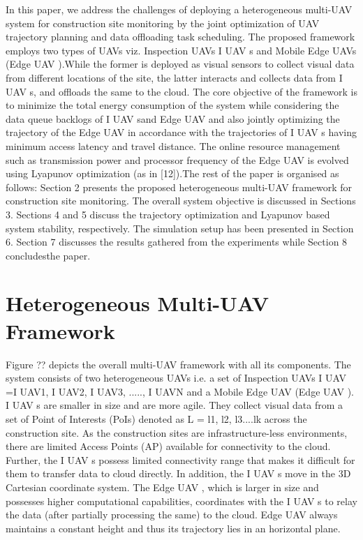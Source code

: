 \documentclass[11pt,twocolumn]{article}
\begin{document}
In this paper, we address the challenges of deploying a heterogeneous multi-UAV system for construction site monitoring by the joint optimization of UAV trajectory planning and data offloading task scheduling. The proposed framework employs two types of UAVs viz. Inspection UAVs I UAV s and Mobile Edge UAVs (Edge UAV ).While the former is deployed as visual sensors to collect visual data from different locations of the site, the latter interacts and collects data from I UAV s, and offloads the same to the cloud. The core objective of the framework is to minimize the total energy consumption of the system while considering the data queue backlogs of I UAV sand Edge UAV and also jointly optimizing the trajectory
of the Edge UAV in accordance with the trajectories of I UAV s having minimum access latency and travel distance. The online resource management such as transmission power and processor frequency of the Edge UAV is evolved using Lyapunov optimization (as in [12]).The rest of the paper is organised as follows: Section 2 presents the proposed heterogeneous multi-UAV framework for construction site monitoring. The overall system objective is discussed in Sections 3. Sections 4 and 5 discuss the trajectory optimization and Lyapunov based system stability, respectively. The simulation setup has been
presented in Section 6. Section 7 discusses the results gathered from the experiments while Section 8 concludesthe paper.
    
\section{Heterogeneous Multi-UAV Framework}
Figure ?? depicts the overall multi-UAV framework with all its components. The system consists of two heterogeneous UAVs i.e. a set of Inspection UAVs I UAV ={I UAV1, I UAV2, I UAV3, ....., I UAVN } and a Mobile Edge UAV (Edge UAV ). I UAV s are smaller in size and are more agile. They collect visual data from a set of Point of Interests (PoIs) denoted as L = {l1, l2, l3....lk} across the construction site. As the construction sites are infrastructure-less environments, there are limited Access Points (AP) available for connectivity to the cloud. Further, the I UAV s possess limited connectivity range that makes it difficult for them to transfer data to cloud directly. In addition, the I UAV s move in the 3D Cartesian coordinate system. The Edge UAV , which is larger in size and possesses higher computational capabilities, coordinates with the I UAV s to relay the data (after partially
processing the same) to the cloud. Edge UAV always maintains a constant height and thus its trajectory lies in
an horizontal plane.
\end{document}
